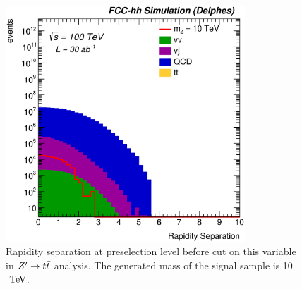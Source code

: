 \documentclass{cernrep}
\begin{document}
\begin{figure}[!htb]\centering
\includegraphics[width=0.8\textwidth]{Fig/Zptt/rapiditySeparation_sel0_before_cut_nostack_log.eps}
\caption{Rapidity separation at preselection level before cut on this variable in $Z^{\prime} \rightarrow t\bar{t}$ analysis. The generated mass of the signal sample is 10 $\TeV$.}
\label{fig:Zptt_sel0_rapidity}
\end{figure}
\end{document}
